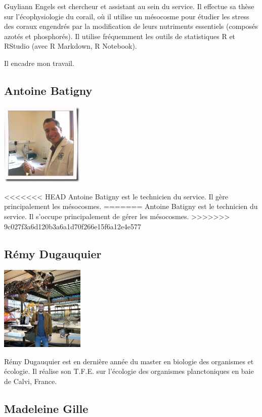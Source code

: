 \documentclass[]{report}
\begin{document}
Guyliann Engels est chercheur et assistant au sein du service. Il
effectue sa thèse sur l'écophysiologie du corail, où il utilise un
mésocosme pour étudier les stress des coraux engendrés par la
modification de leurs nutriments essentiels (composés azotés et
phosphorés). Il utilise fréquemment les outils de statistiques R et
RStudio (avec R Markdown, R Notebook).

Il encadre mon travail.

\subsection{Antoine Batigny}\label{antoine-batigny}

\includegraphics[width=4.00000cm]{../image/antoine2.jpg}

<<<<<<< HEAD
Antoine Batigny est le technicien du service. Il gère principalement les
mésocosmes.
=======
Antoine Batigny est le technicien du service. Il s'occupe principalement
de gérer les mésocosmes.
>>>>>>> 9c027f3a6d120b3a6a1d70f266e15f6a12e4e577

\subsection{Rémy Dugauquier}\label{remy-dugauquier}

\includegraphics[width=4.00000cm]{../image/remy.jpg}

Rémy Dugauquier est en dernière année du master en biologie des
organismes et écologie. Il réalise son T.F.E. sur l'écologie des
organismes planctoniques en baie de Calvi, France.

\subsection{Madeleine Gille}\label{madeleine-gille}
\end{document}
